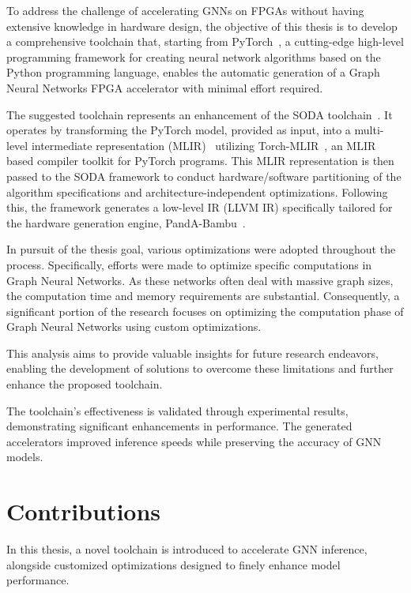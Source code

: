 To address the challenge of accelerating GNNs on FPGAs without having extensive knowledge in hardware design, the objective of this thesis is to develop a comprehensive toolchain that, starting from PyTorch~\cite{DBLP:journals/corr/abs-1912-01703},
a cutting-edge high-level programming framework for creating neural network algorithms based on the Python programming language, enables the
automatic generation of a Graph Neural Networks FPGA accelerator with minimal effort required.

The suggested toolchain represents an enhancement of the SODA toolchain~\cite{9786533}.
It operates by transforming the PyTorch model, provided as input, into a multi-level intermediate representation
(MLIR)~\cite{9370308} utilizing Torch-MLIR~\cite{torch_mlir}, an MLIR based compiler toolkit for PyTorch programs.
This MLIR representation is then passed to the SODA framework to conduct hardware/software partitioning of the algorithm
specifications and architecture-independent optimizations.
Following this, the framework generates a low-level IR (LLVM IR) specifically tailored for the hardware generation engine,
PandA-Bambu~\cite{9586110}.

In pursuit of the thesis goal, various optimizations were adopted throughout the process.
Specifically, efforts were made to optimize specific computations in Graph Neural Networks.
As these networks often deal with massive graph sizes, the computation time and memory requirements are substantial.
Consequently, a significant portion of the research focuses on optimizing the computation phase of Graph Neural Networks using
custom optimizations.

This analysis aims to provide valuable insights for future research endeavors, enabling the development of solutions
to overcome these limitations and further enhance the proposed toolchain.

The toolchain's effectiveness is validated through experimental results, demonstrating significant enhancements in performance.
The generated accelerators improved inference speeds while preserving the accuracy of GNN models.

\section{Contributions}
\label{sec:contributions}%

In this thesis, a novel toolchain is introduced to accelerate GNN inference, alongside customized optimizations designed to finely enhance model performance.

